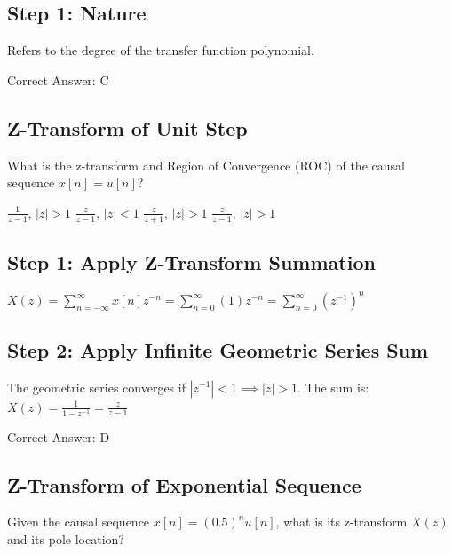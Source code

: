 \begin{solution}

\subsection*{Step 1: Nature}
Refers to the degree of the transfer function polynomial.

Correct Answer: C
\end{solution}

\clearpage

\subsection{Z-Transform of Unit Step}

What is the z-transform and Region of Convergence (ROC) of the causal sequence $x[n] = u[n]$?

\begin{choices}
    \choice $\frac{1}{z-1}$, $|z| > 1$
    \choice $\frac{z}{z-1}$, $|z| < 1$
    \choice $\frac{z}{z+1}$, $|z| > 1$
    \correctchoice $\frac{z}{z-1}$, $|z| > 1$
\end{choices}

\begin{solution}

\subsection*{Step 1: Apply Z-Transform Summation}
$X(z) = \sum_{n=-\infty}^{\infty} x[n] z^{-n} = \sum_{n=0}^{\infty} (1) z^{-n} = \sum_{n=0}^{\infty} (z^{-1})^n$

\subsection*{Step 2: Apply Infinite Geometric Series Sum}
The geometric series converges if $|z^{-1}| < 1 \implies |z| > 1$. The sum is:
$X(z) = \frac{1}{1 - z^{-1}} = \frac{z}{z - 1}$

Correct Answer: D
\end{solution}

\clearpage

\subsection{Z-Transform of Exponential Sequence}

Given the causal sequence $x[n] = (0.5)^n u[n]$, what is its z-transform $X(z)$ and its pole location?

